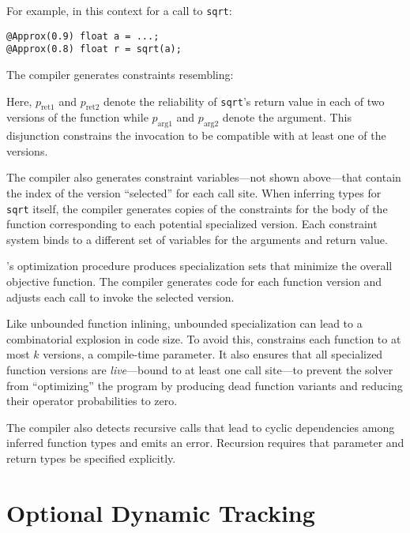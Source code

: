 \documentclass[10pt,nocopyrightspace,preprint]{sigplanconf}
\newcommand{\code}{\lstinline[emphstyle={},keywordstyle={}]}
\begin{document}
For example, in this context for a call to \code{sqrt}:
%
\begin{lstlisting}
@Approx(0.9) float a = ...;
@Approx(0.8) float r = sqrt(a);
\end{lstlisting}
%
The compiler generates constraints resembling:
%
%
Here, $p_\text{ret1}$ and $p_\text{ret2}$ denote the reliability of
\code{sqrt}'s return value in each of two versions of the function while
$p_\text{arg1}$ and $p_\text{arg2}$ denote the argument.
This disjunction constrains the invocation to be compatible with at least one
of the versions.

The compiler also generates constraint variables---not shown above---that
contain the index of the version ``selected'' for each call site.
When inferring types for \code{sqrt} itself, the compiler generates
copies of the constraints for the body of the function corresponding
to each potential specialized version.
Each constraint system binds to a different set of variables for the arguments
and return value.

\lang's optimization procedure produces specialization sets that minimize the
overall objective function.
The compiler generates code for each function version
and adjusts each call to invoke the selected version.

Like unbounded function inlining, unbounded specialization can lead to a
combinatorial explosion in code size.
To avoid this, \lang constrains each function to at most $k$ versions, a
compile-time parameter.
It also ensures that all specialized function versions are \emph{live}---bound to
at least one call site---to
prevent the solver from ``optimizing'' the program by
producing dead function variants and reducing their operator probabilities to
zero.

The compiler also detects recursive calls that lead to cyclic dependencies
among inferred function types and emits an error.
Recursion requires that parameter and return types be specified explicitly.


\section{Optional Dynamic Tracking}
\label{sec:dyn}
\end{document}
